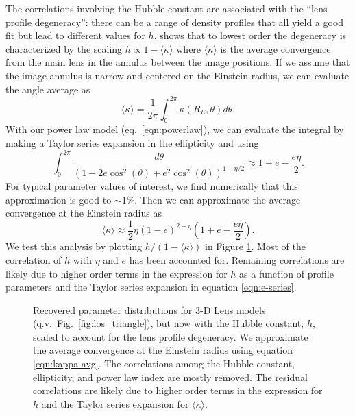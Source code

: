 \documentclass{emulateapj}
\begin{document}
The correlations involving the Hubble constant are associated with the ``lens profile degeneracy'':  there can be a range of density profiles that all yield a good fit but lead to different values for $h$.  \citet{Kochanek02} shows that to lowest order the degeneracy is characterized by the scaling $h \propto 1 - \langle \kappa \rangle$ where $\langle \kappa \rangle$ is the average convergence from the main lens in the annulus between the image positions.  If we assume that the image annulus is narrow and centered on the Einstein radius, we can evaluate the angle average as
\begin{equation}
\langle \kappa \rangle = \frac{1}{2 \pi} \int_{0}^{2 \pi} \kappa(R_E, \theta) d \theta.
\end{equation}
With our power law model (eq.\ \ref{eqn:powerlaw}), we can evaluate the integral by making a Taylor series expansion in the ellipticity and using
\begin{equation}\label{eqn:e-series}
\int_0^{2 \pi} \frac{d \theta}{ (1 - 2 e \cos^2(\theta) + e^2\cos^2(\theta))^{1 - \eta / 2}} \approx 1 + e  - \frac{ e \eta}{2}.
\end{equation}
For typical parameter values of interest, we find numerically that this approximation is good to $\sim1\%$.  Then we can approximate the average convergence at the Einstein radius as
\begin{equation}\label{eqn:kappa-avg}
\langle \kappa \rangle \approx \frac{1}{2} \eta  (1 - e)^{2 - \eta} \left(1 +  e - \frac{e \eta }{2}\right).
\end{equation}
We test this analysis by plotting $h/(1-\langle\kappa\rangle)$ in Figure \ref{fig:scaled_triangle}.  Most of the correlation of $h$ with $\eta$ and $e$ has been accounted for.  Remaining correlations are likely due to higher order terms in the expression for $h$ as a function of profile parameters \citep{Kochanek02} and the Taylor series expansion in equation \ref{eqn:e-series}.

\begin{figure}[t]
\begin{center}
\caption{\label{fig:scaled_triangle} Recovered parameter distributions for 3-D Lens models (q.v.\ Fig.\ \ref{fig:los_triangle}), but now with the Hubble constant, $h$, scaled to account for the lens profile degeneracy.  We approximate the average convergence at the Einstein radius using equation \ref{eqn:kappa-avg}. The correlations among the Hubble constant, ellipticity, and power law index are mostly removed. The residual correlations are likely due to higher order terms in the expression for $h$ \citep{Kochanek02} and the Taylor series expansion for $\langle \kappa \rangle$.%
}
\end{center}
\end{figure}
\end{document}
